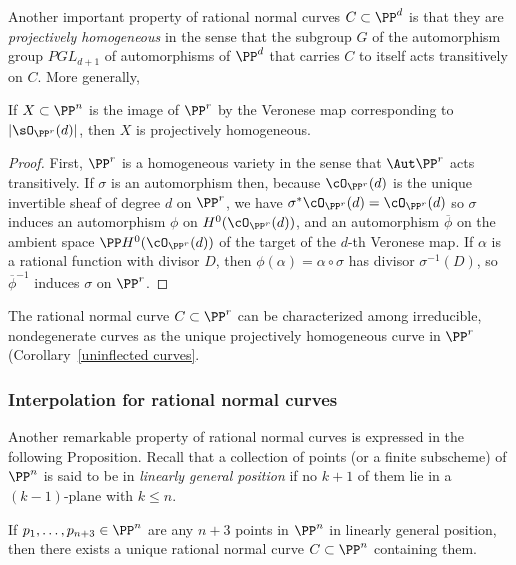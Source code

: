 Another important property of rational normal curves $C \subset \PP^d$ is that they are \emph{projectively homogeneous} in the sense that the subgroup $G$ of the automorphism group $PGL_{d+1}$ of automorphisms of $\PP^d$ that carries $C$ to itself acts transitively on $C$. More generally,

\begin{proposition}\label{Veronese is projectively homogeneous}
If $X\subset \PP^n$ is the image of $\PP^r$ by the Veronese map corresponding to $|\sO_{\PP^r}(d)|$, then $X$ is projectively homogeneous.
\end{proposition}
\begin{proof}
First, $\PP^r$ is a homogeneous variety in the sense that $\Aut \PP^r$ acts transitively. If $\sigma$ is an automorphism then,
 because $\cO_{\PP^r}(d)$ is the unique
invertible sheaf of degree $d$ on $\PP^r$,  we have $\sigma^*\cO_{\PP^r}(d) = \cO_{\PP^r}(d)$ so $\sigma$ induces an automorphism $\phi$ on $H^0(\cO_{\PP^r}(d))$, and an automorphism $\overline \phi$ on the ambient space $\PP H^0(\cO_{\PP^r}(d))$ of the target of the $d$-th Veronese map. If $\alpha$
is a rational function with divisor $D$, then $\phi(\alpha) = \alpha\circ \sigma$ has divisor $\sigma^{-1}(D)$, so $\overline\phi^{-1}$ induces $\sigma$ on $\PP^r$. 
\end{proof}

The rational normal curve $C \subset \PP^r$ can  be characterized among irreducible, nondegenerate curves as the unique projectively homogeneous curve in $\PP^r$ (Corollary~\ref{uninflected curves}.

\subsubsection{Interpolation for rational normal curves}

Another remarkable property of rational normal curves is expressed in the following Proposition. Recall that a collection of points (or a finite subscheme)
of $\PP^n$ is said to be in \emph{linearly general position} if no $k+1$ of them lie in a $(k-1)$-plane with $k\leq n$. 

\begin{proposition}\label{points on rnc}
If $p_1,\dots, p_{n+3} \in \PP^n$ are any $n+3$ points in $\PP^n$ in linearly general position, then there exists a unique rational normal curve $C \subset \PP^n$ containing them.
 \end{proposition}

